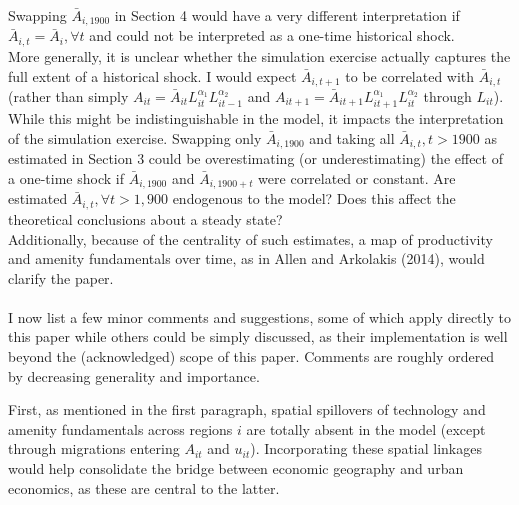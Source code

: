 \documentclass[12pt, final]{article}
\begin{document}
Swapping $\bar{A}_{i,1900}$ in Section 4 would have a very different interpretation if $\bar{A}_{i,t} = \bar{A}_i, \forall t$ and could not be interpreted as a one-time historical shock.
\\
More generally, it is unclear whether the simulation exercise actually captures the full extent of a historical shock. I would expect $\bar{A}_{i,t+1}$ to be correlated with $\bar{A}_{i,t}$ (rather than simply $A_{it} = \bar{A}_{it} L_{it}^{\alpha_1} L_{it-1}^{\alpha_2}$ and $A_{it+1} = \bar{A}_{it+1} L_{it+1}^{\alpha_1} L_{it}^{\alpha_2}$ through $L_{it}$).
While this might be indistinguishable in the model, it impacts the interpretation of the simulation exercise.
Swapping only $\bar{A}_{i,1900}$ and taking all $\bar{A}_{i,t}, t > 1900$ as estimated in Section 3 could be overestimating (or underestimating) the effect of a one-time shock if $\bar{A}_{i,1900}$ and $\bar{A}_{i,1900+t}$ were correlated or constant. 
Are estimated $\bar{A}_{i,t}, \forall t > 1,900$ endogenous to the model? Does this affect the theoretical conclusions about a steady state?
\\
Additionally, because of the centrality of such estimates, a map of productivity and amenity fundamentals over time, as in Allen and Arkolakis (2014), would clarify the paper.
\\
\\

I now list a few minor comments and suggestions, some of which apply directly to this paper while others could be simply discussed, as their implementation is well beyond the (acknowledged) scope of this paper. Comments are roughly ordered by decreasing generality and importance.

First, as mentioned in the first paragraph, spatial spillovers of technology and amenity fundamentals across regions $i$ are totally absent in the model (except through migrations entering $A_{it}$ and $u_{it}$). Incorporating these spatial linkages would help consolidate the bridge between economic geography and urban economics, as these are central to the latter.
\end{document}
